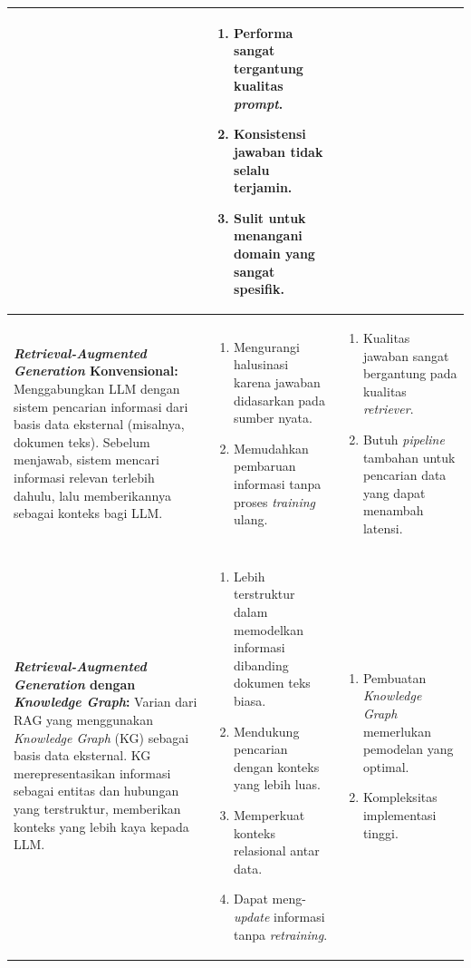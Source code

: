\begin{table}
\begin{tabularx}{\textheight}{|X|p{8.5cm}|p{8.5cm}|}
\begin{enumerate}[leftmargin=*]
		\end{enumerate}
		                &
		\begin{enumerate}[leftmargin=*]
			\item Performa sangat tergantung kualitas \textit{prompt}.
			\item Konsistensi jawaban tidak selalu terjamin.
			\item Sulit untuk menangani domain yang sangat spesifik.
		\end{enumerate}
		\\
		\hline
		\textbf{\textit{Retrieval-Augmented Generation} Konvensional: }
		Menggabungkan LLM dengan sistem pencarian informasi dari basis data eksternal (misalnya, dokumen teks).
		Sebelum menjawab, sistem mencari informasi relevan terlebih dahulu, lalu memberikannya sebagai konteks bagi LLM.
		                &
		\begin{enumerate}[leftmargin=*]
			\item Mengurangi halusinasi karena jawaban didasarkan pada sumber nyata.
			\item Memudahkan pembaruan informasi tanpa proses \textit{training} ulang.
		\end{enumerate}
		                &
		\begin{enumerate}[leftmargin=*]
			\item Kualitas jawaban sangat bergantung pada kualitas \textit{retriever}.
			\item Butuh \textit{pipeline} tambahan untuk pencarian data yang dapat menambah latensi.
		\end{enumerate}
		\\
		\hline
		\textbf{\textit{Retrieval-Augmented Generation} dengan \textit{Knowledge Graph}: }
		Varian dari RAG yang menggunakan \textit{Knowledge Graph} (KG) sebagai basis data eksternal.
		KG merepresentasikan informasi sebagai entitas dan hubungan yang terstruktur, memberikan konteks yang lebih kaya kepada LLM.
		                &
		\begin{enumerate}[leftmargin=*]
			\item Lebih terstruktur dalam memodelkan informasi dibanding dokumen teks biasa.
			\item Mendukung pencarian dengan konteks yang lebih luas.
			\item Memperkuat konteks relasional antar data.
			\item Dapat meng-\textit{update} informasi tanpa \textit{retraining}.
		\end{enumerate}
		                &
		\begin{enumerate}[leftmargin=*]
			\item Pembuatan \textit{Knowledge Graph} memerlukan pemodelan yang optimal.
			\item Kompleksitas implementasi tinggi.
		\end{enumerate}
		\\
		\hline
	\end{tabularx}
\end{table}

